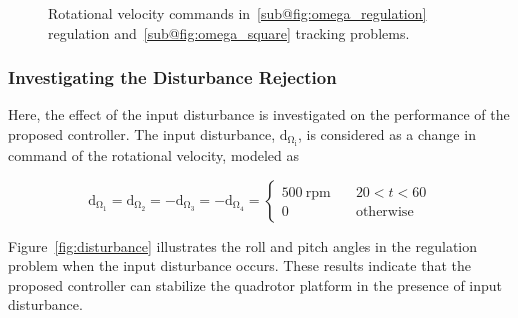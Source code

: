 \documentclass[3p]{elsarticle}
\begin{document}
\begin{figure}[H]
    \caption{Rotational velocity  commands in~\ref{sub@fig:omega_regulation} regulation and~\ref{sub@fig:omega_square} tracking problems.}
    \label{fig:omega}
\end{figure}
\subsubsection{Investigating the Disturbance Rejection}\label{sec:disturbance}
\noindent Here, the effect of the input disturbance is investigated on the performance of the proposed controller.
The input disturbance, $\mathrm{d_{\Omega_i}}$, is considered as a change in command of the rotational velocity, modeled as %

\begin{equation}
    \mathrm{d_{\Omega_1}} = \mathrm{d_{\Omega_2}} = -\mathrm{d_{\Omega_3}} = -\mathrm{d_{\Omega_4}} = \begin{cases}
        500~{\mathrm{rpm}} \quad &20<t<60\\
        0 \quad &\mathrm{otherwise}
    \end{cases}
    \label{eq:disturbance}
\end{equation}

Figure~\ref{fig:disturbance} illustrates the roll and pitch angles in the regulation problem when the input disturbance occurs. These results indicate that the proposed controller can stabilize the quadrotor platform in the presence of input disturbance.



\end{document}
